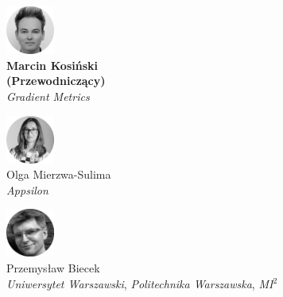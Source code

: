 \begin{minipage}[t]{0.33\textwidth}
	\center     
    \includegraphics[width=60px]{img/people/czarno_biale/marcin-crop.png}   \\
    \textbf{Marcin Kosiński \\ (Przewodniczący)} \\
    \textit{Gradient Metrics}
\end{minipage}
\begin{minipage}[t]{0.33\textwidth}
	\center 
    \includegraphics[width=60px]{img/people/czarno_biale/olga-crop.png}    \\
    Olga Mierzwa-Sulima \\
	\textit{Appsilon}  
\end{minipage}
\begin{minipage}[t]{0.33\textwidth}
	\center     
    \includegraphics[width=60px]{img/people/czarno_biale/przemek-crop.png}   \\
    Przemysław Biecek \\
	\textit{Uniwersytet Warszawski}, \textit{Politechnika Warszawska}, \textit{MI$^{2}$}    
\end{minipage}


